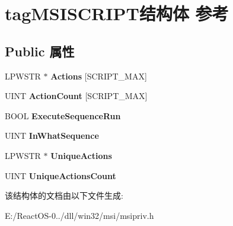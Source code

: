 \hypertarget{structtag_m_s_i_s_c_r_i_p_t}{}\section{tag\+M\+S\+I\+S\+C\+R\+I\+P\+T结构体 参考}
\label{structtag_m_s_i_s_c_r_i_p_t}
\subsection*{Public 属性}
\begin{DoxyCompactItemize}
\item 
\mbox{\label{structtag_m_s_i_s_c_r_i_p_t_a4c86584f1d304be7f88e90a444d5e3ef}} 
L\+P\+W\+S\+TR $\ast$ {\bfseries Actions} \mbox{[}S\+C\+R\+I\+P\+T\+\_\+\+M\+AX\mbox{]}
\item 
\mbox{\label{structtag_m_s_i_s_c_r_i_p_t_ae456040dfdd87fd4c59cfbad1096448b}} 
U\+I\+NT {\bfseries Action\+Count} \mbox{[}S\+C\+R\+I\+P\+T\+\_\+\+M\+AX\mbox{]}
\item 
\mbox{\label{structtag_m_s_i_s_c_r_i_p_t_a58dfb67be4416d69088231ad71f6e4cc}} 
B\+O\+OL {\bfseries Execute\+Sequence\+Run}
\item 
\mbox{\label{structtag_m_s_i_s_c_r_i_p_t_a2c6c36d5b3f9a231aab39ac00187ff77}} 
U\+I\+NT {\bfseries In\+What\+Sequence}
\item 
\mbox{\label{structtag_m_s_i_s_c_r_i_p_t_a1f47109f03eb495ee45dd8ddbccecc45}} 
L\+P\+W\+S\+TR $\ast$ {\bfseries Unique\+Actions}
\item 
\mbox{\label{structtag_m_s_i_s_c_r_i_p_t_abd1e5c326feb70ca5d6856e91171fb44}} 
U\+I\+NT {\bfseries Unique\+Actions\+Count}
\end{DoxyCompactItemize}


该结构体的文档由以下文件生成\+:\begin{DoxyCompactItemize}
\item 
E\+:/\+React\+O\+S-\/0../dll/win32/msi/msipriv.\+h\end{DoxyCompactItemize}
